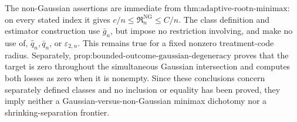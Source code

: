 The non-Gaussian assertions are immediate from \(\text{thm:adaptive-rootn-minimax}\): on every stated index it gives \(c/n\le\mathfrak R_n^{\mathrm{NG}}\le C/n\).  The class definition and estimator construction use \(\bar g_n\), but impose no restriction involving, and make no use of, \(\widehat q_n,\bar q_n\), or \(\varepsilon_{2,n}\).  This remains true for a fixed nonzero treatment-code radius.  Separately, \(\text{prop:bounded-outcome-gaussian-degeneracy}\) proves that the target is zero throughout the simultaneous Gaussian intersection and computes both losses as zero when it is nonempty.  Since these conclusions concern separately defined classes and no inclusion or equality has been proved, they imply neither a Gaussian-versus-non-Gaussian minimax dichotomy nor a shrinking-separation frontier.